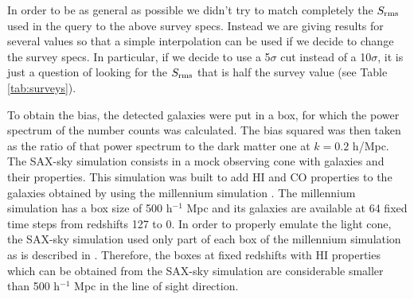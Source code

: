 \documentclass[useAMS,usenatbib]{mn2e}
\begin{document}
In order to be as general as possible we didn't try to match completely the $S_{\rm rms}$ used in the query to the above survey specs. Instead we are giving results for several values so that a simple interpolation can be used if we decide to change the survey specs. In particular, if we decide to use a 5$\sigma$ cut instead of a 10$\sigma$, it is just a question of looking for the $S_{\rm rms}$ that is half the survey value (see Table~ \ref{tab:surveys}). 

To obtain the bias, the detected galaxies were put in a box, for which the power spectrum of the number counts was calculated. The bias squared was then taken as the ratio of that power spectrum to the dark matter one at $k=0.2$ h/Mpc. 
The SAX-sky simulation consists in a mock observing cone with galaxies and their properties. This simulation was built to add HI and CO properties to the galaxies obtained by \cite{2007MNRAS.375....2D} using the  millennium simulation \cite{2005Natur.435..629S}.  The millennium simulation has a box size of 500 h$^{-1}$ Mpc and its galaxies are available at  64 fixed time steps from redshifts 127 to 0. In order to properly emulate the light cone, the SAX-sky simulation used only part of each box of the millennium simulation as is described in \cite{2009ApJ...703.1890O}.  Therefore, the boxes at fixed redshifts with HI properties which can be obtained from the SAX-sky simulation are considerable smaller than 500 h$^{-1}$ Mpc in the line of sight direction. 
%
\end{document}
